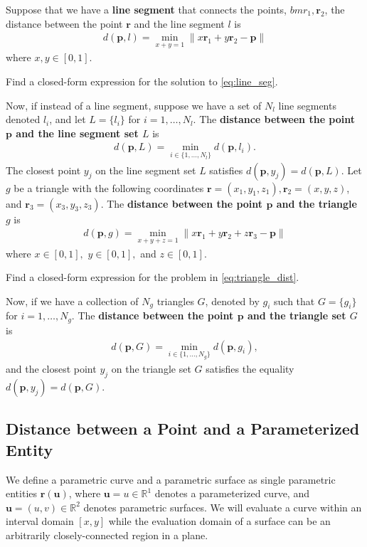  Suppose that we have a \textbf{line segment} that connects the points, $bm{r}_1, \bm{r}_2$, the distance between the point $\bm{r}$ and the line segment $l$ is
 \begin{align}
 	d(\bm{p}, l) = \min_{x+y=1} \|x\bm{r}_1 + y \bm{r}_2 - \bm{p} \|
 	\label{eq:line_seg}
 \end{align}
 where $x, y \in [0, 1 ]$.
 \begin{homework}
 	Find a closed-form expression for the solution to \eqref{eq:line_seg}.
 \end{homework}
%
Now, if instead of a line segment, suppose we have a set of $N_l$ line segments denoted $l_i$, and let $L=\{l_i\}$ for $i=1,\ldots,N_l$. The \textbf{distance between the point $\bm{p}$ and the line segment set $L$} is 
%
\begin{align}
	d(\bm{p}, L) = \min_{i\in \{1,\ldots, N_l\}} d(\bm{p}, l_i).
\end{align}
%
The closest point $y_j$ on the line segment set $L$ satisfies $d(\bm{p}, y_j) = d(\bm{p}, L)$.
%
Let $g$ be a triangle with the following coordinates  $\bm{r}=(x_1,y_1,z_1), \bm{r}_2 = (x, y, z)$, and $\bm{r}_3 = (x_3,y_3,z_3)$. The \textbf{distance between the point $\bm{p}$ and the triangle $g$} is 
%
\begin{align}
	d(\bm{p}, g) = \min_{x+y+z=1} \| x\bm{r}_1 + y\bm{r}_2 + z \bm{r}_3 - \bm{p} \|
	\label{eq:triangle_dist}
\end{align}
%
where $x \in [0,1], \,\, y\in [0,1],$ and $z \in [0,1]$. 
%
\begin{homework}
	Find a closed-form expression for the problem in \eqref{eq:triangle_dist}.
\end{homework}
 
 Now, if we have a collection of $N_g$ triangles $G$, denoted by $g_i$ such that $G =\{g_i\}$ for $i=1,\ldots,N_g$. The \textbf{distance between the point $\bm{p}$ and the triangle set $G$} is 
 \begin{align}
 	d(\bm{p}, G) = \min_{i\in \{1,\ldots, N_g\}} d(\bm{p}, g_i),
 \end{align}
 and the closest point $y_j$ on the triangle set $G$ satisfies the equality $d(\bm{p}, y_j) = d(\bm{p}, G)$.
 
 \subsection{Distance between a Point and a  Parameterized  Entity}
We define a parametric curve and a parametric surface as single parametric entities $\bm{r}(\bm{u})$, where $\bm{u} = u\in \mathbb{R}^1$ denotes a parameterized curve, and $\bm{u} = (u,v) \in \mathbb{R}^2$ denotes parametric surfaces. We will evaluate a curve within an interval domain \eg $[x,y]$ while the evaluation domain of a surface can be an arbitrarily closely-connected region in a plane. 


